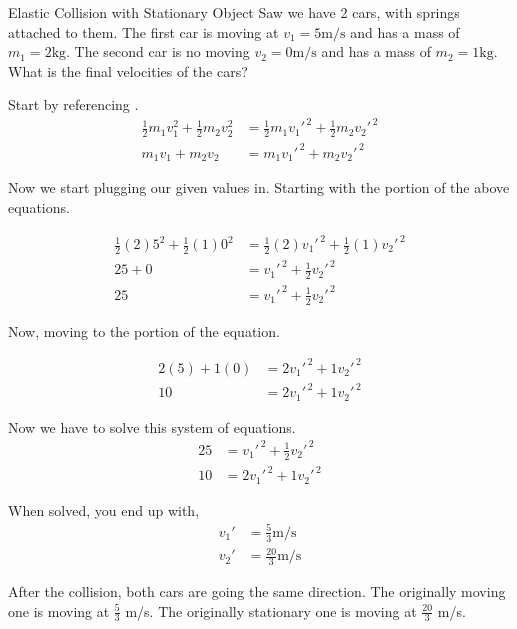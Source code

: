 \begin{example}[]{Elastic Collision with Stationary Object}
  Saw we have 2 cars, with springs attached to them.
  The first car is moving at $v_{1} = 5 \si{\meter / \second}$ and has a mass of $m_{1} = 2 \si{\kilo \gram}$.
  The second car is no moving $v_{2} = 0 \si{\meter / \second}$ and has a mass of $m_{2} = 1 \si{\kilo \gram}$.
  What is the final velocities of the cars?

  \tcblower

  Start by referencing .
  \begin{align*}
    \frac{1}{2} m_{1} v_{1}^{2} + \frac{1}{2} m_{2} v_{2}^{2} &= \frac{1}{2} m_{1} v_{1}'^{\,2} + \frac{1}{2} m_{2} v_{2}'^{\,2} \\
    m_{1} v_{1} + m_{2} v_{2} &= m_{1} v_{1}'^{\,2} + m_{2} v_{2}'^{\,2}
  \end{align*}

  Now we start plugging our given values in.
  Starting with the  portion of the above equations.

  \begin{align*}
    \frac{1}{2} (2) 5^{2} + \frac{1}{2} (1) 0^{2} &= \frac{1}{2} (2) v_{1}'^{\,2} + \frac{1}{2} (1) v_{2}'^{\,2} \\
    25 + 0 &= v_{1}'^{\,2} + \frac{1}{2} v_{2}'^{\,2} \\
    25 &= v_{1}'^{\,2} + \frac{1}{2} v_{2}'^{\,2}
  \end{align*}

  Now, moving to the  portion of the equation.

  \begin{align*}
    2 (5) + 1 (0) &= 2 v_{1}'^{\,2} + 1 v_{2}'^{\,2} \\
    10 &= 2 v_{1}'^{\,2} + 1 v_{2}'^{\,2}
  \end{align*}

  Now we have to solve this system of equations.
  \begin{align*}
    25 &= v_{1}'^{\,2} + \frac{1}{2} v_{2}'^{\,2} \\
    10 &= 2 v_{1}'^{\,2} + 1 v_{2}'^{\,2}
  \end{align*}

  When solved, you end up with,
  \begin{align*}
    v_{1}' &= \frac{5}{3} \si{\meter / \second} \\
    v_{2}' &= \frac{20}{3} \si{\meter / \second}
  \end{align*}

  After the collision, both cars are going the same direction.
  The originally moving one is moving at $\frac{5}{3}$ \si{\meter / \second}.
  The originally stationary one is moving at $\frac{20}{3}$ \si{\meter / \second}.
\end{example}

